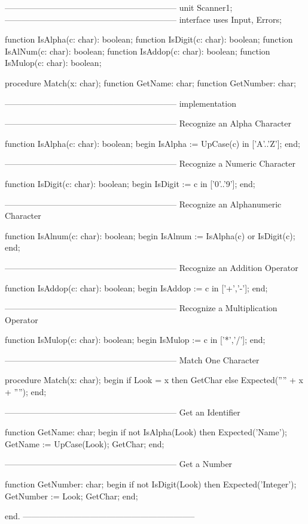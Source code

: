 \documentclass[float=false, crop=false]{standalone}
\begin{document}
\begin{code}
{--------------------------------------------------------------}
unit Scanner1;
{--------------------------------------------------------------}
interface
uses Input, Errors;

function IsAlpha(c: char): boolean;
function IsDigit(c: char): boolean;
function IsAlNum(c: char): boolean;
function IsAddop(c: char): boolean;
function IsMulop(c: char): boolean;

procedure Match(x: char);
function GetName: char;
function GetNumber: char;

{--------------------------------------------------------------}
implementation

{--------------------------------------------------------------}
{ Recognize an Alpha Character }

function IsAlpha(c: char): boolean;
begin
	IsAlpha := UpCase(c) in ['A'..'Z'];
end;

{--------------------------------------------------------------}
{ Recognize a Numeric Character }

function IsDigit(c: char): boolean;
begin
	IsDigit := c in ['0'..'9'];
end;

{--------------------------------------------------------------}
{ Recognize an Alphanumeric Character }

function IsAlnum(c: char): boolean;
begin
	IsAlnum := IsAlpha(c) or IsDigit(c);
end;

{--------------------------------------------------------------}
{ Recognize an Addition Operator }

function IsAddop(c: char): boolean;
begin
	IsAddop := c in ['+','-'];
end;

{--------------------------------------------------------------}
{ Recognize a Multiplication Operator }

function IsMulop(c: char): boolean;
begin
	IsMulop := c in ['*','/'];
end;

{--------------------------------------------------------------}
{ Match One Character }

procedure Match(x: char);
begin
	if Look = x then GetChar
	else Expected('''' + x + '''');
end;

{--------------------------------------------------------------}
{ Get an Identifier }

function GetName: char;
begin
	if not IsAlpha(Look) then Expected('Name');
	GetName := UpCase(Look);
	GetChar;
end;

{--------------------------------------------------------------}
{ Get a Number }

function GetNumber: char;
begin
	if not IsDigit(Look) then Expected('Integer');
	GetNumber := Look;
	GetChar;
end;

end.
{--------------------------------------------------------------}
\end{code}
\end{document}
